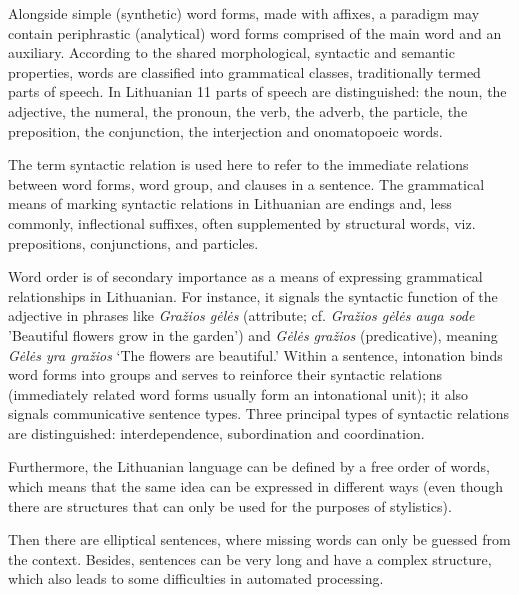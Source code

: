 \begin{multicols}{2}

Alongside simple (synthetic) word forms, made with affixes, a paradigm may contain periphrastic (analytical) word forms comprised of the main word and an auxiliary.
    According to the shared morphological, syntactic and semantic properties, words are classified into grammatical classes, traditionally termed parts of speech. In Lithuanian 11 parts of speech are distinguished: the noun, the adjective, the numeral, the pronoun, the verb, the adverb, the particle, the preposition, the conjunction, the interjection and onomatopoeic words.

    The term syntactic relation is used here to refer to the immediate relations between word forms, word group, and clauses in a sentence. The grammatical means of marking syntactic relations in Lithuanian are endings and, less commonly, inflectional suffixes, often supplemented by structural words, viz. prepositions, conjunctions, and particles. 
    
    Word order is of secondary importance as a means of expressing grammatical relationships in Lithuanian. For instance, it signals the syntactic function of the adjective in phrases like \textit{Gražios gėlės} (attribute; cf. \textit{Gražios gėlės auga sode} 'Beautiful flowers grow in the garden') and \textit{Gėlės gražios} (predicative), meaning \textit{Gėlės yra gražios} ‘The flowers are beautiful.' Within a sentence, intonation binds word forms into groups and serves to reinforce their syntactic relations (immediately related word forms usually form an intonational unit); it also signals communicative sentence types. Three principal types of syntactic relations are distinguished: interdependence, subordination and coordination.

    Furthermore, the Lithuanian language can be defined by a free order of words, which means that the same idea can be expressed in different ways (even though there are structures that can only be used for the purposes of stylistics).

Then there are elliptical sentences, where missing words can only be guessed from the context. Besides, sentences can be very long and have a complex structure, which also leads to some difficulties in automated processing.



\end{multicols}
